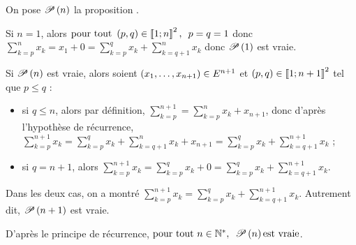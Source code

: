 \begin{dem}[1]
On pose \(\P{n}\) la proposition .

Si \(n=1\), alors \(\quantifs{\tpt\paren{p,q}\in\interventierii{1}{n}^2}p=q=1\) donc \(\sum_{k=p}^nx_k=x_1+0=\sum_{k=p}^qx_k+\sum_{k=q+1}^nx_k\) donc \(\P{1}\) est vraie.

Si \(\P{n}\) est vraie, alors soient \(\paren{x_1,\dots,x_{n+1}}\in E^{n+1}\) et \(\paren{p,q}\in\interventierii{1}{n+1}^2\) tel que \(p\leq q\) :

\begin{itemize}
    \item si \(q\leq n\), alors par définition, \(\sum_{k=p}^{n+1}=\sum_{k=p}^nx_k+x_{n+1}\), donc d'après l'hypothèse de récurrence, \(\sum_{k=p}^{n+1}x_k=\sum_{k=p}^qx_k+\sum_{k=q+1}^nx_k+x_{n+1}=\sum_{k=p}^qx_k+\sum_{k=q+1}^{n+1}x_k\) ; \\
    \item si \(q=n+1\), alors \(\sum_{k=p}^{n+1}x_k=\sum_{k=p}^qx_k+0=\sum_{k=p}^qx_k+\sum_{k=q+1}^{n+1}x_k\).
\end{itemize}

Dans les deux cas, on a montré \(\sum_{k=p}^{n+1}x_k=\sum_{k=p}^qx_k+\sum_{k=q+1}^{n+1}x_k\). Autrement dit, \(\P{n+1}\) est vraie.

D'après le principe de récurrence, \(\quantifs{\tpt n\in\Ns}\P{n}\text{est vraie}\).
\end{dem}


